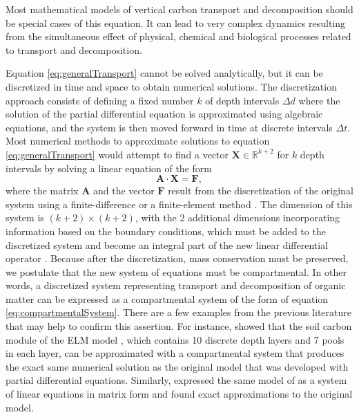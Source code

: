 \documentclass[11pt, oneside, a4paper]{article}   	%
\begin{document}
Most mathematical models of vertical carbon transport and decomposition should be special cases of this equation. It can lead to very complex dynamics resulting from the simultaneous effect of physical, chemical and biological processes related to transport and decomposition. 

Equation \ref{eq:generalTransport} cannot be solved analytically, but it can be discretized in time and space to obtain numerical solutions. The discretization approach consists of defining a fixed number $k$ of depth intervals $\Delta d$ where the solution of the partial differential equation is approximated using algebraic equations, and the system is then moved forward in time at discrete intervals $\Delta t$. Most numerical methods to approximate solutions to equation \ref{eq:generalTransport} would attempt to find a vector $\bm{X} \in \mathbb{R}^{k+2}$ for $k$ depth intervals by solving a linear equation of the form
\begin{equation} \label{eq:discreteSystem}
\mathbf{A} \cdot \bm{X} = \bm{F},
\end{equation}
where the matrix $\mathbf{A}$ and the vector $\bm{F}$ result from the discretization of the original system using a finite-difference or a finite-element method \citep{Lanczos,LeVeque2007}. The dimension of this system is $(k+2) \times (k+2)$, with the 2 additional dimensions incorporating information based on the boundary conditions, which must be added to the discretized system and become an integral part of the new linear differential operator \citep{Lanczos}. Because after the discretization, mass conservation must be preserved, we postulate that the new system of equations must be compartmental. In other words, a discretized system representing transport and decomposition of organic matter can be expressed as a compartmental system of the form of equation \ref{eq:compartmentalSystem}. There are a few examples from the previous literature that may help to confirm this assertion. For instance, \citet{Metzler2020JAMES} showed that the soil carbon module of the ELM model \citep{Koven2013BGS}, which contains 10 discrete depth layers and 7 pools in each layer, can be approximated with a compartmental system that produces the exact same numerical solution as the original model that was developed with partial differential equations. Similarly, \citep{Huang2018} expressed the same model of \citet{Koven2013BGS} as a system of linear equations in matrix form and found exact approximations to the original model.
\end{document}
